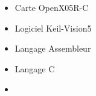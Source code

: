 \documentclass{article}
\begin{document}
\begin{tabular}
\begin{itemize}
\begin{itemize}
            \item \textcolor{gray!100}{Carte OpenX05R-C}
            \item \textcolor{gray!100}{Logiciel Keil-\textmu Vision5 }
            \item \textcolor{gray!100}{Langage Assembleur}
            \item \textcolor{gray!100}{Langage C}
            \item[\textcolor{white}{}] {} %
     
        \end{itemize}
    \end{itemize}
\end{tabular}



\begin{center}
\end{center}
\end{document}
